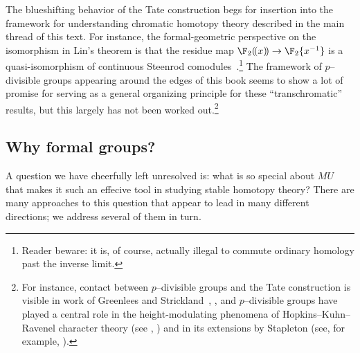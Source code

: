 The blueshifting behavior of the Tate construction begs for insertion into the framework for understanding chromatic homotopy theory described in the main thread of this text.  For instance, the formal-geometric perspective on the isomorphism in Lin's theorem is that the residue map \(\F_2(\!(x)\!) \to \F_2\{x^{-1}\}\) is a quasi-isomorphism of continuous Steenrod comodules~\cite[Remark 8.34]{StricklandFSFG}.\footnote{Reader beware: it is, of course, actually illegal to commute ordinary homology past the inverse limit.}  The framework of \(p\)--divisible groups appearing around the edges of this book seems to show a lot of promise for serving as a general organizing principle for these ``transchromatic'' results, but this largely has not been worked out.\footnote{For instance, contact between \(p\)--divisible groups and the Tate construction is visible in work of Greenlees and Strickland~\cite{GreenleesStrickland}, \cite[pg.\ 10]{StricklandFPFP}, and \(p\)--divisible groups have played a central role in the height-modulating phenomena of Hopkins--Kuhn--Ravenel character theory (see , \cite{HKR}) and in its extensions by Stapleton (see, for example, \cite{Stapleton}).}






\subsection*{Why formal groups?}

A question we have cheerfully left unresolved is: what is so special about \(MU\) that makes it such an effecive tool in studying stable homotopy theory?  There are many approaches to this question that appear to lead in many different directions; we address several of them in turn.

